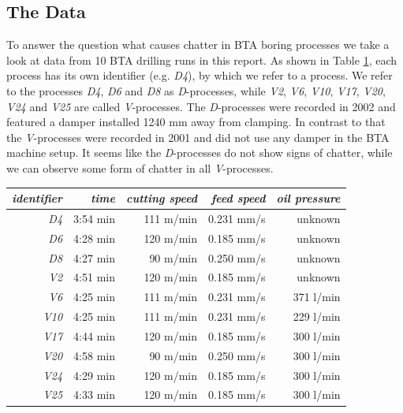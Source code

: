 \documentclass[12 pt]{scrartcl}
\begin{document}
\subsection{The Data}

To answer the question what causes chatter in BTA boring processes we take a look at data from 10 BTA drilling runs in this report.
As shown in Table \ref{tab:parameters}, each process has its own identifier (e.g. \emph{D4}), by which we refer to a process.
We refer to the processes \emph{D4}, \emph{D6} and \emph{D8} as \emph{D}-processes, while \emph{V2}, \emph{V6}, \emph{V10}, \emph{V17}, \emph{V20}, \emph{V24} and \emph{V25} are called \emph{V}-processes.
The \emph{D}-processes were recorded in 2002 and featured a damper installed 1240 mm away from clamping. In contrast to that the \emph{V}-processes were recorded in 2001 and did not use any damper in the BTA machine setup. It seems like the \emph{D}-processes do not show signs of chatter, while we can observe some form of chatter in all \emph{V}-processes.


\begin{table}[ht]
  \centering
  \label{tab:parameters}
  \begin{tabular}{r|rrrr}
    \emph{identifier} & \emph{time} & \emph{cutting speed} & \emph{feed speed} & \emph{oil pressure} \\
    \hline
    \emph{D4}         & 3:54 min    & 111 m/min            & 0.231 mm/s        & unknown             \\
    \emph{D6}         & 4:28 min    & 120 m/min            & 0.185 mm/s        & unknown             \\
    \emph{D8}         & 4:27 min    & 90 m/min             & 0.250 mm/s        & unknown             \\
    \emph{V2}         & 4:51 min    & 120 m/min            & 0.185 mm/s        & unknown             \\
    \emph{V6}         & 4:25 min    & 111 m/min            & 0.231 mm/s        & 371 l/min           \\
    \emph{V10}        & 4:25 min    & 111 m/min            & 0.231 mm/s        & 229 l/min           \\
    \emph{V17}        & 4:44 min    & 120 m/min            & 0.185 mm/s        & 300 l/min           \\
    \emph{V20}        & 4:58 min    & 90 m/min             & 0.250 mm/s        & 300 l/min           \\
    \emph{V24}        & 4:29 min    & 120 m/min            & 0.185 mm/s        & 300 l/min           \\
    \emph{V25}        & 4:33 min    & 120 m/min            & 0.185 mm/s        & 300 l/min           \\
  \end{tabular}
\end{table}
\end{document}
